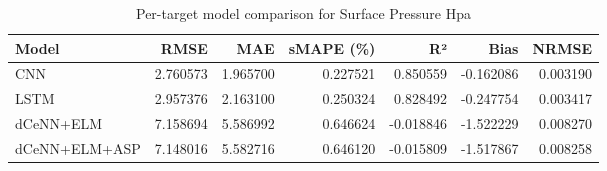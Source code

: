 \begin{table}
\caption{Per-target model comparison for Surface Pressure Hpa}
\begin{tabular}{lrrrrrr}
\toprule
Model & RMSE & MAE & sMAPE (\%) & R² & Bias & NRMSE \\
\midrule
CNN & 2.760573 & 1.965700 & 0.227521 & 0.850559 & -0.162086 & 0.003190 \\
LSTM & 2.957376 & 2.163100 & 0.250324 & 0.828492 & -0.247754 & 0.003417 \\
dCeNN+ELM & 7.158694 & 5.586992 & 0.646624 & -0.018846 & -1.522229 & 0.008270 \\
dCeNN+ELM+ASP & 7.148016 & 5.582716 & 0.646120 & -0.015809 & -1.517867 & 0.008258 \\
\bottomrule
\end{tabular}
\end{table}
